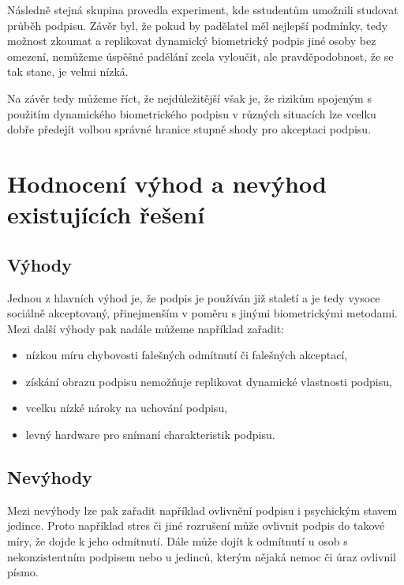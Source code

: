 Následně stejná skupina provedla experiment, kde sstudentům umožnili studovat průběh podpisu.
Závěr byl, že pokud by padělatel měl nejlepší podmínky, tedy možnost zkoumat a replikovat dynamický biometrický podpis jiné osoby bez omezení, 
nemůžeme úspěšné padělání zcela vyloučit, ale pravděpodobnost, že se tak stane, je velmi nízká.~\cite{8585636} %

Na závěr tedy můžeme říct, že nejdůležitější však je, že rizikům spojeným s použitím dynamického biometrického podpisu v různých situacích lze vcelku dobře 
předejít volbou správné hranice stupně shody pro akceptaci podpisu.~\cite{8585636} %

\section{Hodnocení výhod a nevýhod existujících řešení}
\subsection*{Výhody}
Jednou z hlavních výhod je, že podpis je používán již staletí a je tedy vysoce sociálně akceptovaný, přinejmenším v poměru s jinými biometrickými metodami.
Mezi další výhody pak nadále můžeme například zařadit:

\begin{itemize}
  \item nízkou míru chybovosti falešných odmítnutí či falešných akceptací,
  \item získání obrazu podpisu nemožňuje replikovat dynamické vlastnosti podpisu,
  \item vcelku nízké nároky na uchování podpisu,
  \item levný hardware pro snímaní charakteristik podpisu.
\end{itemize}

\subsection*{Nevýhody}
Mezi nevýhody lze pak zařadit například ovlivnění podpisu i psychickým stavem jedince.
Proto například stres či jiné rozrušení může ovlivnit podpis do takové míry, že dojde k jeho odmítnutí.
Dále může dojít k odmítnutí u osob s nekonzistentním podpisem nebo u jedinců, kterým nějaká nemoc či úraz ovlivnil písmo.

